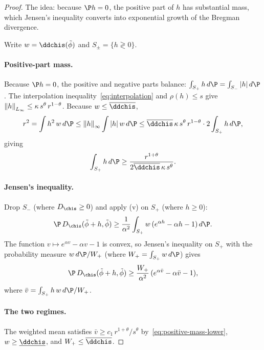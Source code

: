 \documentclass{article}
\begin{document}
\begin{proof}
The idea: because $\P h = 0$,
the positive part of $h$
has substantial mass,
which Jensen's inequality converts
into exponential growth
of the Bregman divergence.

Write $w = \ddchis(\tilde\phi)$
and $S_{\pm} = \{h \gtrless 0\}$.

\paragraph{Positive-part mass.}
Because $\P h = 0$,
the positive and negative parts balance:
$\int_{S_+} h\, d\P = \int_{S_-} |h|\, d\P$.
The interpolation inequality~\eqref{eq:interpolation}
and $\rho(h) \le s$ give
$\norm{h}_{L_\infty}
  \le \kappa\, s^\theta\, r^{1-\theta}$.
Because $w \le \overline{\ddchis}$,
\begin{equation}
\label{eq:f-plus-mass}
r^2
  = \int h^2\, w\, d\P
  \le \norm{h}_\infty \int |h|\, w\, d\P
  \le \overline{\ddchis}\, \kappa\, s^\theta\, r^{1-\theta}
    \cdot 2\int_{S_+} h\, d\P,
\end{equation}
giving
\begin{equation}
\label{eq:positive-mass-lower}
\int_{S_+} h\, d\P
  \ge \frac{r^{1+\theta}}{2\overline{\ddchis}\, \kappa\, s^\theta}.
\end{equation}

\paragraph{Jensen's inequality.}
Drop $S_-$ (where $D_{\chis} \ge 0$)
and apply
(v)
on $S_+$ (where $h \ge 0$):
\[
\P\, D_{\chis}(\tilde\phi + h, \tilde\phi)
  \ge \frac{1}{\alpha^2} \int_{S_+}
    w\, (e^{\alpha h} - \alpha h - 1)\, d\P.
\]
The function $v \mapsto e^{\alpha v} - \alpha v - 1$
is convex, so Jensen's inequality
on $S_+$ with the probability measure
$w\, d\P / W_+$ (where $W_+ = \int_{S_+} w\, d\P$)
gives
\[
\P\, D_{\chis}(\tilde\phi + h, \tilde\phi)
  \ge \frac{W_+}{\alpha^2}\,
    (e^{\alpha \bar v} - \alpha \bar v - 1),
\]
where $\bar v = \int_{S_+} h\, w\, d\P / W_+$.

\paragraph{The two regimes.}
The weighted mean satisfies
$\bar v \ge c_1\, r^{1+\theta}/s^\theta$
by~\eqref{eq:positive-mass-lower},
$w \ge \underline{\ddchis}$,
and $W_+ \le \overline{\ddchis}$.


\end{proof}
\end{document}
